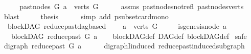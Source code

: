 \begin{isabellebody}
%
\isadelimproof
%
\endisadelimproof
%
\isatagproof
{}\isamarkupfalse%
\ {\isacharminus}{\kern0pt}\isanewline
\ \ \isamarkupfalse%
\ {\isachardoublequoteopen}past{\isacharunderscore}{\kern0pt}nodes\ G\ a\ {\isasymsubset}\ verts\ G{\isachardoublequoteclose}\isanewline
\ \ \ \ \isamarkupfalse%
\ assms{\isacharparenleft}{\kern0pt}{}{\isacharparenright}{\kern0pt}\ past{\isacharunderscore}{\kern0pt}nodes{\isacharunderscore}{\kern0pt}not{\isacharunderscore}{\kern0pt}refl\ past{\isacharunderscore}{\kern0pt}nodes{\isacharunderscore}{\kern0pt}verts\ \isamarkupfalse%
\ blast\isanewline
\ \ \isamarkupfalse%
\ \isamarkupfalse%
\ {\isacharquery}{\kern0pt}thesis\isanewline
\ \ \ \ \isamarkupfalse%
\ {\isacharparenleft}{\kern0pt}simp\ add{\isacharcolon}{\kern0pt}\ psubset{\isacharunderscore}{\kern0pt}card{\isacharunderscore}{\kern0pt}mono{\isacharparenright}{\kern0pt}\isanewline
{}\isamarkupfalse%
%
\endisatagproof
{\isafoldproof}%
%
\isadelimproof
\ \isanewline
%
\endisadelimproof
\isanewline
\isanewline
\isanewline
\isanewline
{}\isamarkupfalse%
\ {\isacharparenleft}{\kern0pt}\ blockDAG{\isacharparenright}{\kern0pt}\ reduce{\isacharunderscore}{\kern0pt}past{\isacharunderscore}{\kern0pt}dagbased{\isacharcolon}{\kern0pt}\isanewline
\ \ \ {\isachardoublequoteopen}\ a\ {\isasymin}\ verts\ G{\isachardoublequoteclose}\isanewline
\ \ \ \ \ {\isachardoublequoteopen}{\isasymnot}is{\isacharunderscore}{\kern0pt}genesis{\isacharunderscore}{\kern0pt}node\ a{\isachardoublequoteclose}\isanewline
\ \ \ {\isachardoublequoteopen}blockDAG\ {\isacharparenleft}{\kern0pt}reduce{\isacharunderscore}{\kern0pt}past\ G\ a{\isacharparenright}{\kern0pt}{\isachardoublequoteclose}\isanewline
%
\isadelimproof
\ \ %
\endisadelimproof
%
\isatagproof
{}\isamarkupfalse%
\ blockDAG{\isacharunderscore}{\kern0pt}def\ DAG{\isacharunderscore}{\kern0pt}def\ blockDAG{\isacharunderscore}{\kern0pt}def\isanewline
\isanewline
{}\isamarkupfalse%
\ safe\isanewline
\ \ \isamarkupfalse%
\ {\isachardoublequoteopen}digraph\ {\isacharparenleft}{\kern0pt}reduce{\isacharunderscore}{\kern0pt}past\ G\ a{\isacharparenright}{\kern0pt}{\isachardoublequoteclose}\isanewline
\ \ \ \ \isamarkupfalse%
\ digraphI{\isacharunderscore}{\kern0pt}induced\ reduce{\isacharunderscore}{\kern0pt}past{\isacharunderscore}{\kern0pt}induced{\isacharunderscore}{\kern0pt}subgraph\ \isamarkupfalse%

\end{isabellebody}
